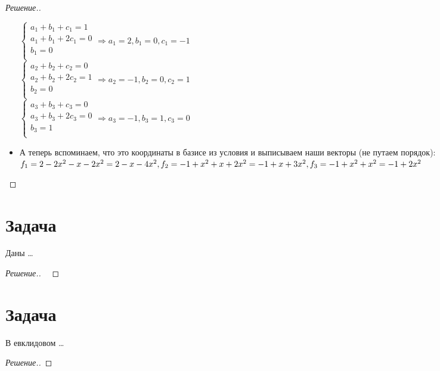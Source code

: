 \documentclass[a4paper]{article}
\theoremstyle{remark}
\begin{document}
\begin{proof}[Решение.]
\begin{itemize}
      $\begin{cases}
          a_1 + b_1 + c_1 = 1 \\
          a_1 + b_1 + 2c_1 = 0 \\
          b_1 = 0 \\
      \end{cases} \Rightarrow a_1 = 2, b_1 = 0, c_1 = -1$ \\
      $\begin{cases}
        a_2 + b_2 + c_2 = 0 \\
        a_2 + b_2 + 2c_2 = 1 \\
        b_2 = 0 \\ 
    \end{cases} \Rightarrow a_2 = -1, b_2 = 0, c_2 = 1$ \\
    $\begin{cases}
      a_3 + b_3 + c_3 = 0 \\
      a_3 + b_3 + 2c_3 = 0 \\
      b_3 = 1 \\ 
  \end{cases} \Rightarrow a_3 = -1, b_3 = 1, c_3 = 0$ 
  \item А теперь вспоминаем, что это координаты в базисе из условия и выписываем
  наши векторы (не путаем порядок): $f_1 = 2 - 2x^2 - x -2x^2 = 2 - x -4x^2, \\
  f_2 = -1 + x^2  + x + 2x^2 = -1 + x + 3x^2, \\
  f_3 = -1 + x^2 + x^2 = -1 + 2x^2$ 
          \end{itemize}
        \end{proof}
    
    \section*{Задача }
        Даны \dots
        \begin{proof}[Решение.] \ 
            
        \end{proof}
      
    \section*{Задача }
        В евклидовом \dots
        \begin{proof}[Решение.]
            
        \end{proof}
    
\end{document}
